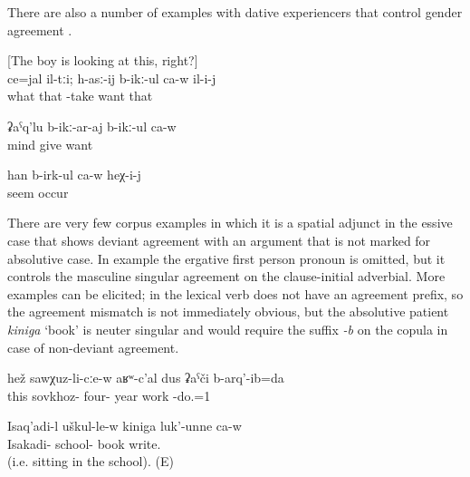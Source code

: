 There are also a number of examples with dative experiencers that control gender agreement .
%
\begin{exe}
	\ex	\label{ex:Maybe these, he wants to take} [‎The boy is looking at this, right?]\\
	\gll	ce=jal	il-tːi;	h-asː-ij	b-ikː-ul	ca-w	il-i-j\\
		what	that	-take	want		that	\\
	\glt	{}

	\ex	\label{ex:wants to give him knowledge}
	\gll	ʡaˁq'lu	b-ikː-ar-aj	b-ikː-ul	ca-w\\
		mind	give		want	\\
	\glt	{}

	\ex	\label{ex:bring those years back now}
	\gll	han	b-irk-ul	ca-w	heχ-i-j\\
		seem	occur		\\
	\glt	{} 
\end{exe}

There are very few corpus examples in which it is a spatial adjunct in the essive case that shows deviant agreement with an argument that is not marked for absolutive case. In example  the ergative first person pronoun is omitted, but it controls the masculine singular agreement on the clause-initial adverbial. More examples can be elicited; in  the lexical verb does not have an agreement prefix, so the agreement mismatch is not immediately obvious, but the absolutive patient \textit{kiniga} `book' is neuter singular and would require the suffix \textit{-b} on the copula in case of non-deviant agreement.

\begin{exe}
	\ex	\label{ex:In the sovkhoz I worked for 40 years.}
	\gll	hež	sawχuz-li-cːe-w	aʁʷ-c'al	dus	ʡaˁči	b-arq'-ib=da\\
			this	sovkhoz-	four-	year	work	-do.=1\\
		\glt	{}
		
			\ex	\label{ex:Isakadi is writing a book in the school.}
	\gll	Isaq'adi-l	uškul-le-w	kiniga	luk'-unne	ca-w\\
		Isakadi-	school-	book	write.		\\
	\glt	{} (i.e. sitting in the school). (E)
\end{exe}

